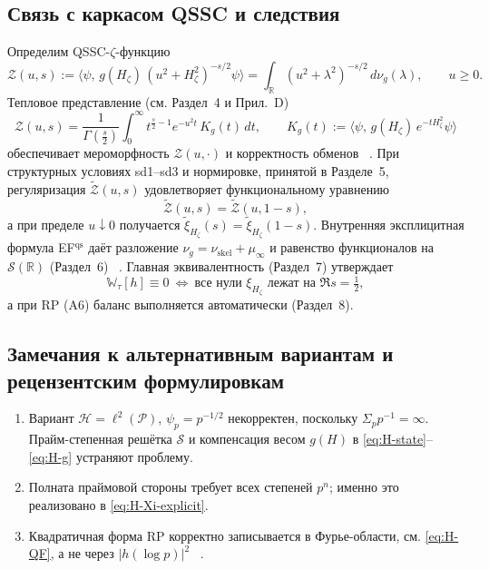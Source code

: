 \documentclass{article}
\numberwithin{equation}{section}
\theoremstyle{plain}
\theoremstyle{definition}
\theoremstyle{remark}
\def\infty{∞}\def\partial{∂}\def\sum{Σ}\def\int{∫}%
\def\cdot{·}\def\times{×}\def\pm{±}\def\mp{∓}\def\approx{≈}%
\begin{document}
\subsection*{Связь с каркасом QSSC и следствия}

Определим QSSC-\(\zeta\)-функцию ~\cite{Seeley1967, Elizalde1995}
\begin{equation}\label{eq:H-Zeta}
\mathcal Z(u,s):=\big\langle \psi,\,g(H_\zeta)\,(u^2+H_\zeta^2)^{-s/2}\psi\big\rangle
=\int_{\mathbb R}(u^2+\lambda^2)^{-s/2}\,d\nu_g(\lambda),\qquad u\ge 0.
\end{equation}
Тепловое представление (см. Раздел~4 и Прил.~D)
\begin{equation}\label{eq:H-heat}
\mathcal Z(u,s)=\frac{1}{\Gamma(\tfrac s2)}\int_0^\infty t^{\frac s2-1}e^{-u^2 t}\,K_g(t)\,dt,\qquad
K_g(t):=\langle \psi,\,g(H_\zeta)\,e^{-tH_\zeta^2}\psi\rangle
\end{equation}
обеспечивает мероморфность \(\mathcal Z(u,\cdot)\) и корректность обменов ~\cite{Gilkey1995, BerlineGetzlerVergne1992}. 
При структурных условиях sd1–sd3 и нормировке, принятой в Разделе~5, регуляризация \(\widetilde{\mathcal Z}(u,s)\) 
удовлетворяет функциональному уравнению ~\cite{Riemann1859, Titchmarsh1986}
\begin{equation}\label{eq:H-FE}
\widetilde{\mathcal Z}(u,s)=\widetilde{\mathcal Z}(u,1-s),
\end{equation}
а при пределе \(u\downarrow 0\) получается \(\widetilde{\xi}_{H_\zeta}(s)=\widetilde{\xi}_{H_\zeta}(1-s)\). 
Внутренняя эксплицитная формула EF\(^{\mathrm{qs}}\) даёт разложение \(\nu_g=\nu_{\mathrm{skel}}+\mu_\infty\) 
и равенство функционалов на \(\mathcal S(\mathbb R)\) (Раздел~6) ~\cite{Weil1952, Connes1999}. 
Главная эквивалентность (Раздел~7) утверждает
\begin{equation}\label{eq:H-balance-axis}
\mathbb W_\tau[h]\equiv 0\ \Longleftrightarrow\ \text{все нули }\xi_{H_\zeta}\text{ лежат на }\Re s=\tfrac12,
\end{equation}
а при RP (A6) баланс выполняется автоматически (Раздел~8).

\subsection*{Замечания к альтернативным вариантам и рецензентским формулировкам}

\begin{enumerate}
\item Вариант \(\mathcal H=\ell^2(\mathcal P)\), \(\psi_p=p^{-1/2}\) некорректен, поскольку \(\sum_{p}p^{-1}=\infty\). ~\cite{Edwards1974}
Прайм-степенная решётка \(\mathcal S\) и компенсация весом \(g(H)\) в \eqref{eq:H-state}–\eqref{eq:H-g} устраняют проблему.
\item Полната праймовой стороны требует всех степеней \(p^n\); именно это реализовано в \eqref{eq:H-Xi-explicit}.
\item Квадратичная форма RP корректно записывается в Фурье-области, см. \eqref{eq:H-QF}, а не через \(|h(\log p)|^2\) ~\cite{OsterwalderSchrader1973}.
\end{enumerate}
\end{document}
